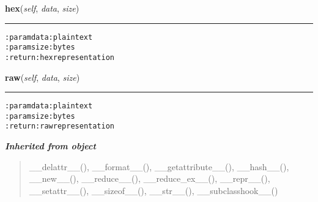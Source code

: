 \hspace{.8\funcindent}\begin{boxedminipage}{\funcwidth}

    \raggedright \textbf{hex}(\textit{self}, \textit{data}, \textit{size})

    \vspace{-1.5ex}

    \rule{\textwidth}{0.5\fboxrule}
\setlength{\parskip}{2ex}
\begin{alltt}

:param data: plaintext
:param size: bytes
:return: hex representation
\end{alltt}

\setlength{\parskip}{1ex}
    \end{boxedminipage}

    \label{hal:maths:crypt:MD6:raw}

    \vspace{0.5ex}

\hspace{.8\funcindent}\begin{boxedminipage}{\funcwidth}

    \raggedright \textbf{raw}(\textit{self}, \textit{data}, \textit{size})

    \vspace{-1.5ex}

    \rule{\textwidth}{0.5\fboxrule}
\setlength{\parskip}{2ex}
\begin{alltt}

:param data: plaintext
:param size: bytes
:return: raw representation
\end{alltt}

\setlength{\parskip}{1ex}
    \end{boxedminipage}


\large{\textbf{\textit{Inherited from object}}}

\begin{quote}
\_\_delattr\_\_(), \_\_format\_\_(), \_\_getattribute\_\_(), \_\_hash\_\_(), \_\_new\_\_(), \_\_reduce\_\_(), \_\_reduce\_ex\_\_(), \_\_repr\_\_(), \_\_setattr\_\_(), \_\_sizeof\_\_(), \_\_str\_\_(), \_\_subclasshook\_\_()
\end{quote}


